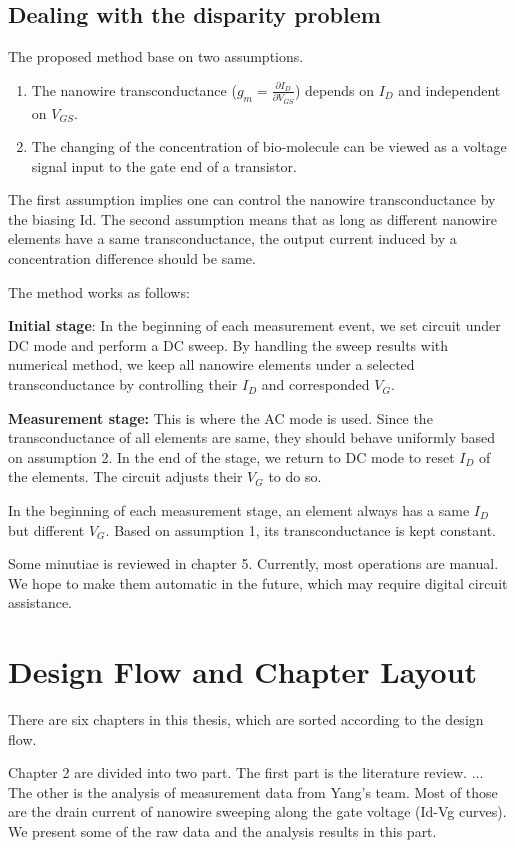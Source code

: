 \subsection*{Dealing with the disparity problem}
The proposed method base on two assumptions.
\begin{enumerate}
    \item The nanowire transconductance ($g_m = \frac{\partial I_D}{\partial V_{GS}}$) depends on $I_D$ and independent on $V_{GS}$.
    \item The changing of the concentration of bio-molecule can be viewed as a voltage signal input to the gate end of a transistor.
\end{enumerate}
The first assumption implies one can control the nanowire transconductance by the biasing Id.
The second assumption means that as long as different nanowire elements have a same transconductance, the output current induced by a concentration difference should be same.

The method works as follows:

\textbf{Initial stage}: In the beginning of each measurement event, we set circuit under DC mode and perform a DC sweep.
By handling the sweep results with numerical method, we keep all nanowire elements under a selected transconductance by controlling their $I_D$ and corresponded $V_G$.

\textbf{Measurement stage:} This is where the AC mode is used.
Since the transconductance of all elements are same, they should behave uniformly based on assumption 2.
In the end of the stage, we return to DC mode to reset $I_D$ of the elements.
The circuit adjusts their $V_G$ to do so.

In the beginning of each measurement stage, an element always has a same $I_D$ but different $V_G$.
Based on assumption 1, its transconductance is kept constant.


Some minutiae is reviewed in chapter 5.
Currently, most operations are manual.
We hope to make them automatic in the future, which may require digital circuit assistance.


\section{Design Flow and Chapter Layout}
There are six chapters in this thesis, which are sorted according to the design flow.

Chapter 2 are divided into two part.
The first part is the literature review. {\color{red}...} The other is the analysis of measurement data from Yang's team.
Most of those are the drain current of nanowire sweeping along the gate voltage (Id-Vg curves).
We present some of the raw data and the analysis results in this part.

